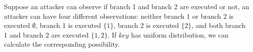 Suppose an attacker can observe if branch 1 and branch 2 are executed or not, 
an attacker can have four different observations: neither branch 1 or 
branch 2 is executed $\emptyset$, branch 1 is executed $\{1\}$, branch 2
is executed $\{2\}$, and both branch 1 and branch 2 are executed $\{1, 2\}$.
If $key$ has uniform distribution, we can calculate the corresponding
possibility.
\begin{table}[ht]
    \centering
\end{table}








